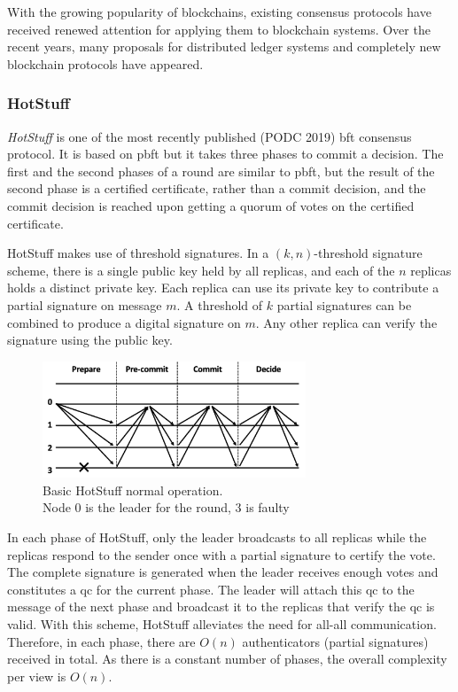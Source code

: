 With the growing popularity of blockchains, existing consensus protocols have received renewed attention for applying them to blockchain systems.  Over the recent years, many proposals for distributed ledger systems and completely new blockchain protocols have appeared. 

\subsubsection{HotStuff}

\textit{HotStuff} \citep{hotstuff} is one of the most recently published (PODC 2019) \gls{bft} consensus protocol. It is based on \gls{pbft} but it takes three phases to commit a decision. The first and the second phases of a round are similar to \gls{pbft}, but the result of the second phase is a certified certificate, rather than a commit decision, and the commit decision is reached upon getting a quorum of votes on the certified certificate.

HotStuff makes use of threshold signatures. In a $(k, n)$-threshold signature scheme, there is a single public key held by all replicas, and each of the $n$ replicas holds a distinct private key. Each replica can use its private key to contribute a partial signature on message $m$. A threshold of $k$ partial signatures can be combined to produce a digital signature on $m$. Any other replica can verify the signature using the public key.

\begin{figure}[h]
\centering
    \includegraphics[width=0.7\textwidth]{img/hotStuff.png}
    \caption{Basic HotStuff normal operation.\\ 
    Node $0$ is the leader for the round, 3 is faulty}
    \label{fig:hotstuff}
\end{figure}

In each phase of HotStuff, only the leader broadcasts to all replicas while the replicas respond to the sender once with a partial signature to certify the vote. The complete signature is generated when the leader receives enough votes and constitutes a \gls{qc} for the current phase. The leader will attach this \gls{qc} to the message of the next phase and broadcast it to the replicas that verify the \gls{qc} is valid. With this scheme, HotStuff alleviates the need for all-all communication. Therefore, in each phase, there are $O(n)$ authenticators (partial signatures) received in total. As there is a constant number of phases, the overall complexity per view is $O(n)$.


